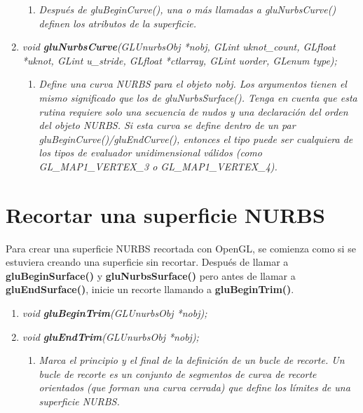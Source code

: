 \begin{enumerate}
\begin{enumerate}
        \item[] \textit{Después de gluBeginCurve(), una o más llamadas a
            gluNurbsCurve() definen los atributos de la superficie.
        }
    \end{enumerate}
    \item[] \emph{void \textbf{gluNurbsCurve}(GLUnurbsObj *nobj, GLint uknot\_count,
    GLfloat *uknot, GLint u\_stride, GLfloat *ctlarray,
    GLint uorder, GLenum type);}
    \begin{enumerate}
        \item[] \textit{Define una curva NURBS para el objeto nobj.
            Los argumentos tienen el mismo significado que los de gluNurbsSurface().
            Tenga en cuenta que esta rutina requiere solo una secuencia
            de nudos y una declaración del orden del objeto NURBS. Si
            esta curva se define dentro de un par gluBeginCurve()/gluEndCurve(),
            entonces el tipo puede ser cualquiera de los tipos de evaluador
            unidimensional válidos (como GL\_MAP1\_VERTEX\_3 o GL\_MAP1\_VERTEX\_4).
        }
    \end{enumerate}
\end{enumerate}

\section{Recortar una superficie NURBS}

Para crear una superficie NURBS recortada con OpenGL, se comienza como
si se estuviera creando una superficie sin recortar.
Después de llamar a \textbf{gluBeginSurface()} y \textbf{gluNurbsSurface()}
pero antes de llamar a \textbf{gluEndSurface()}, inicie un recorte
llamando a \textbf{gluBeginTrim()}.

\begin{enumerate}
    \item[] \emph{void \textbf{gluBeginTrim}(GLUnurbsObj *nobj);}
    \item[] \emph{void \textbf{gluEndTrim}(GLUnurbsObj *nobj);}
    \begin{enumerate}
        \item[] \textit{Marca el principio y el final de la definición
            de un bucle de recorte. Un bucle de recorte es un conjunto
            de segmentos de curva de recorte orientados (que forman
            una curva cerrada) que define los límites de una superficie NURBS.
        }
    \end{enumerate}
\end{enumerate}

